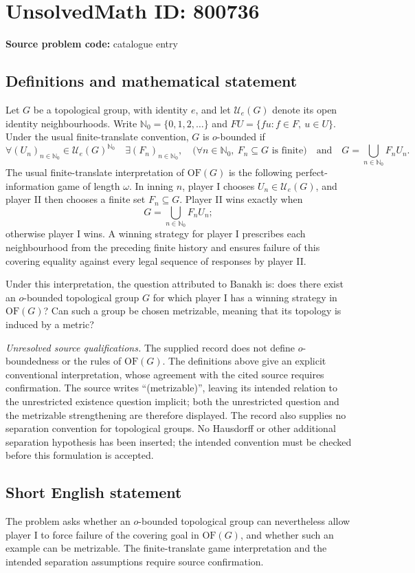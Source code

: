\documentclass[11pt]{article}
\newcommand{\N}{\mathbb{N}}
\begin{document}
\section*{UnsolvedMath ID: 800736}
\textbf{Source problem code:} catalogue entry
\subsection{Definitions and mathematical statement}
Let \(G\) be a topological group, with identity \(e\), and let \(\mathcal U_e(G)\) denote its open identity neighbourhoods. Write \(\N_0=\{0,1,2,\ldots\}\) and \(FU=\{fu:f\in F,\ u\in U\}\). Under the usual finite-translate convention, \(G\) is \(o\)-bounded if
\[
\forall (U_n)_{n\in\N_0}\in\mathcal U_e(G)^{\N_0}\quad
\exists (F_n)_{n\in\N_0},\quad
\bigl(\forall n\in\N_0,\ F_n\subseteq G\text{ is finite}\bigr)
\quad\text{and}\quad
G=\bigcup_{n\in\N_0}F_nU_n.
\]
The usual finite-translate interpretation of \(\mathrm{OF}(G)\) is the following perfect-information game of length \(\omega\). In inning \(n\), player I chooses \(U_n\in\mathcal U_e(G)\), and player II then chooses a finite set \(F_n\subseteq G\). Player II wins exactly when
\[
G=\bigcup_{n\in\N_0}F_nU_n;
\]
otherwise player I wins. A winning strategy for player I prescribes each neighbourhood from the preceding finite history and ensures failure of this covering equality against every legal sequence of responses by player II.

Under this interpretation, the question attributed to Banakh is: does there exist an \(o\)-bounded topological group \(G\) for which player I has a winning strategy in \(\mathrm{OF}(G)\)? Can such a group be chosen metrizable, meaning that its topology is induced by a metric?

\emph{Unresolved source qualifications.} The supplied record does not define \(o\)-boundedness or the rules of \(\mathrm{OF}(G)\). The definitions above give an explicit conventional interpretation, whose agreement with the cited source requires confirmation. The source writes ``(metrizable)'', leaving its intended relation to the unrestricted existence question implicit; both the unrestricted question and the metrizable strengthening are therefore displayed. The record also supplies no separation convention for topological groups. No Hausdorff or other additional separation hypothesis has been inserted; the intended convention must be checked before this formulation is accepted.
\subsection{Short English statement}
The problem asks whether an \(o\)-bounded topological group can nevertheless allow player I to force failure of the covering goal in \(\mathrm{OF}(G)\), and whether such an example can be metrizable. The finite-translate game interpretation and the intended separation assumptions require source confirmation.
\end{document}

